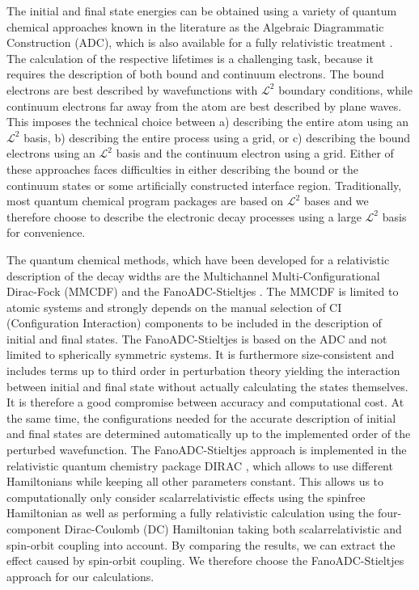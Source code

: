 The initial and final state energies can be obtained using      
a variety of quantum chemical approaches known in the literature as the       
Algebraic Diagrammatic Construction \cite{Schirmer82_1,Schirmer91,Schirmer98, 
Mertins96_1} (ADC), which is also                               
available for a fully relativistic treatment                    
\cite{Pernpointner04_1,Pernpointner04_2,Pernpointner10_1}.
The calculation of the respective lifetimes is a challenging task, because it
requires the description of both bound and continuum electrons. The bound electrons
are best described by wavefunctions with $\mathcal{L}^2$ boundary conditions,
while continuum electrons far away from the atom are best described by
plane waves. This imposes the technical choice between a) describing the entire
atom using an $\mathcal{L}^2$ basis, b) describing the entire process using
a grid, or c) describing the bound electrons using an $\mathcal{L}^2$ basis
and the continuum electron using a grid.
Either     
of these approaches faces difficulties in either describing the bound or the  
continuum states or some artificially constructed interface region.
Traditionally, most quantum
chemical program packages are based on $\mathcal{L}^2$ bases and we therefore
choose to describe the electronic decay processes using a large $\mathcal{L}^2$
basis for convenience.

The quantum chemical methods, which have been developed for a relativistic
description of the decay widths are the Multichannel Multi-Configurational
Dirac-Fock (MMCDF) \cite{Fritzsche11} and the FanoADC-Stieltjes \cite{Fasshauer15_1}.
The MMCDF is limited to atomic systems and strongly depends on
the manual selection of CI (Configuration
Interaction) components to be included in the description of initial and      
final states.
The FanoADC-Stieltjes is based on the ADC and not limited to spherically symmetric
systems.
It is furthermore size-consistent and includes terms up to third order
in perturbation theory yielding the interaction between initial and final state
without actually calculating the states themselves.
It is therefore a good compromise between
accuracy and computational cost. At the same time, the configurations needed for the
accurate description of initial and final states are determined automatically up to
the implemented order of the perturbed wavefunction.
The FanoADC-Stieltjes approach is implemented in the relativistic
quantum chemistry package
DIRAC \cite{DIRAC17}, which allows to use different Hamiltonians while keeping
all other parameters constant. This allows us to computationally only consider
scalarrelativistic effects using the spinfree Hamiltonian as well as
performing a fully relativistic calculation using the four-component
Dirac-Coulomb (DC) Hamiltonian taking both scalarrelativistic and
spin-orbit coupling into account.
By comparing the results, we can extract the effect caused by spin-orbit coupling.
We therefore choose the FanoADC-Stieltjes approach for our calculations.


